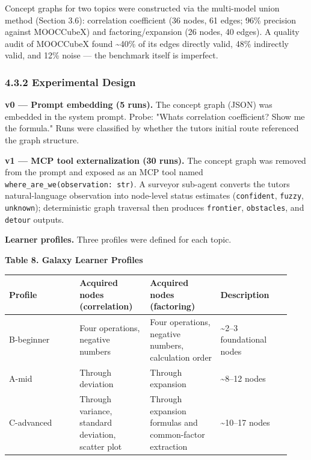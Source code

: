 \documentclass[
]{article}
\newcounter{none} %
\begin{document}
Concept graphs for two topics were constructed via the multi-model union method (Section 3.6): correlation coefficient (36 nodes, 61 edges; 96\% precision against MOOCCubeX) and factoring/expansion (26 nodes, 40 edges). A quality audit of MOOCCubeX found \textasciitilde40\% of its edges directly valid, 48\% indirectly valid, and 12\% noise --- the benchmark itself is imperfect.

\subsubsection{4.3.2 Experimental Design}\label{432-experimental-design}

\textbf{v0 --- Prompt embedding (5 runs).} The concept graph (JSON) was embedded in the system prompt. Probe: "What\textquotesingle s correlation coefficient? Show me the formula." Runs were classified by whether the tutor\textquotesingle s initial route referenced the graph structure.

\textbf{v1 --- MCP tool externalization (30 runs).} The concept graph was removed from the prompt and exposed as an MCP tool named \texttt{where\_are\_we(observation:\ str)}. A surveyor sub-agent converts the tutor\textquotesingle s natural-language observation into node-level status estimates (\texttt{confident}, \texttt{fuzzy}, \texttt{unknown}); deterministic graph traversal then produces \texttt{frontier}, \texttt{obstacles}, and \texttt{detour} outputs.

\textbf{Learner profiles.} Three profiles were defined for each topic.

\textbf{Table 8. Galaxy Learner Profiles}

{\def\LTcaptype{none} %
\begin{longtable}[]{@{}>{\raggedright\arraybackslash}p{0.233\linewidth}>{\raggedright\arraybackslash}p{0.233\linewidth}>{\raggedright\arraybackslash}p{0.233\linewidth}>{\raggedright\arraybackslash}p{0.233\linewidth}@{}}
\toprule\noalign{}
Profile & Acquired nodes (correlation) & Acquired nodes (factoring) & Description \\
\midrule\noalign{}
\endhead
\bottomrule\noalign{}
\endlastfoot
B-beginner & Four operations, negative numbers & Four operations, negative numbers, calculation order & \textasciitilde2--3 foundational nodes \\
A-mid & Through deviation & Through expansion & \textasciitilde8--12 nodes \\
C-advanced & Through variance, standard deviation, scatter plot & Through expansion formulas and common-factor extraction & \textasciitilde10--17 nodes \\
\end{longtable}
}
\end{document}
